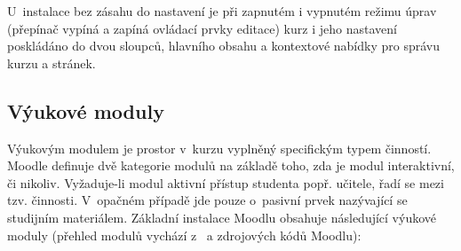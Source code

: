 \documentclass[
print,
  11pt,
  table,   
  nolof,    
  nolot,
  oneside,
  draft
]{fithesis3}
\begin{document}
U~instalace bez zásahu do nastavení je při zapnutém i vypnutém režimu úprav (přepínač vypíná a zapíná ovládací prvky editace) kurz i jeho nastavení poskládáno do dvou sloupců, hlavního obsahu a kontextové nabídky pro správu kurzu a stránek.

		\subsection{Výukové moduly}
Výukovým modulem je prostor v~kurzu vyplněný specifickým typem činností. Moodle definuje dvě kategorie modulů na základě toho, zda je modul interaktivní, či nikoliv. Vyžaduje-li modul aktivní přístup studenta popř. učitele, řadí se mezi tzv. činnosti. V~opačném případě jde pouze o~pasivní prvek nazývající se studijním materiálem.
Základní instalace Moodlu obsahuje následující výukové moduly (přehled modulů vychází z~\cite{drlik} a zdrojových kódů Moodlu): 
\end{document}
